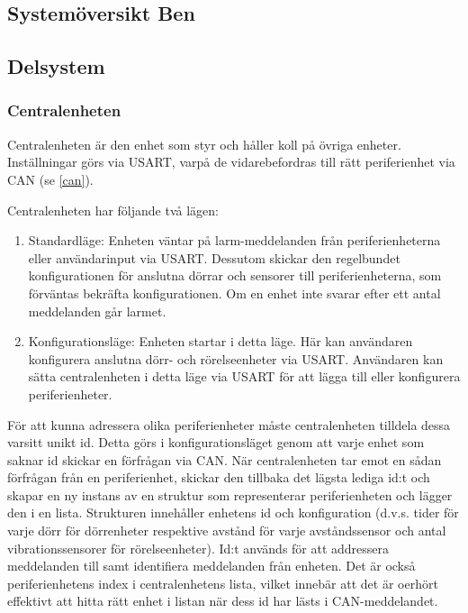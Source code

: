 \documentclass{article}
\begin{document}
\subsection{Systemöversikt Ben}
\subsection{Delsystem }
\subsubsection{Centralenheten}
Centralenheten är den enhet som styr och håller koll på övriga enheter. Inställningar görs via USART, varpå de vidarebefordras till rätt periferienhet via CAN (se \ref{can}). 

Centralenheten har följande två lägen:

\begin{enumerate}
    \item Standardläge: Enheten väntar på larm-meddelanden från periferienheterna eller användarinput via USART. Dessutom skickar den regelbundet  konfigurationen för anslutna dörrar och sensorer till periferienheterna, som förväntas bekräfta konfigurationen. Om en enhet inte svarar efter ett antal meddelanden går larmet.
    \item Konfigurationsläge: Enheten startar i detta läge. Här kan användaren konfigurera anslutna dörr- och rörelseenheter via USART. Användaren kan sätta centralenheten i detta läge via USART för att lägga till eller konfigurera periferienheter.
\end{enumerate}

För att kunna adressera olika periferienheter måste centralenheten tilldela dessa varsitt unikt id. Detta görs i konfigurationsläget genom att varje enhet som saknar id skickar en förfrågan via CAN. När centralenheten tar emot en sådan förfrågan från en periferienhet, skickar den tillbaka det lägsta lediga id:t och skapar en ny instans av en struktur som representerar periferienheten och lägger den i en lista. Strukturen innehåller enhetens id och konfiguration (d.v.s. tider för varje dörr för dörrenheter respektive avstånd för varje avståndssensor och antal vibrationssensorer för rörelseenheter). Id:t används för att addressera meddelanden till samt identifiera meddelanden från enheten. Det är också periferienhetens index i centralenhetens lista, vilket innebär att det är oerhört effektivt att hitta rätt enhet i listan när dess id har lästs i CAN-meddelandet.
\end{document}
